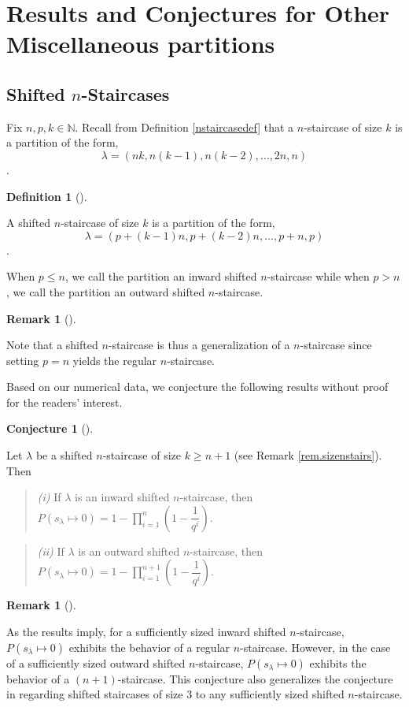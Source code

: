 \documentclass[numbers=enddot,12pt,final,onecolumn,notitlepage]{scrartcl}%
\theoremstyle{definition}
\newtheorem{defi}[theo]{Definition}
\newenvironment{definition}[1][]
{\begin{defi}[#1]\begin{leftbar}}
{\end{leftbar}\end{defi}}
\newtheorem{remk}[theo]{Remark}
\newenvironment{remark}[1][]
{\begin{remk}[#1]\begin{leftbar}}
{\end{leftbar}\end{remk}}
\newtheorem{conj}[theo]{Conjecture}
\newenvironment{conjecture}[1][]
{\begin{conj}[#1]\begin{leftbar}}
{\end{leftbar}\end{conj}}
\newenvironment{statement}{\begin{quote}}{\end{quote}}
\let\prodnonlimits\prod
\renewcommand{\prod}{\prodnonlimits\limits}
\newcommand{\NN}{\mathbb{N}}
\renewcommand{\leq}{\leqslant}
\renewcommand{\geq}{\geqslant}
\theoremstyle{plainsl}
\begin{document}
\section{Results and Conjectures for Other Miscellaneous partitions}
\subsection{Shifted $n$-Staircases}
Fix $n,p,k \in \NN$. Recall from Definition \ref{nstaircasedef} that a $n$-staircase of size $k$ is a partition of the form,
\[\lambda = (nk, n(k-1), n(k-2), \ldots,2n, n) \].

\begin{definition}
\label{shifted}
A shifted $n$-staircase of size $k$ is a partition of the form, 
\[\lambda = (p+(k-1)n, p+(k-2)n, \ldots,p+n, p) \].

When $p \leq n$, we call the partition an inward shifted $n$-staircase while when  $p > n$, we call the partition an outward shifted $n$-staircase.

\end{definition}

\begin{remark}
Note that a shifted $n$-staircase is thus a generalization of a $n$-staircase since setting $p=n$ yields the regular $n$-staircase.
\end{remark}

Based on our numerical data, we conjecture the following results without proof for the readers' interest. 

\begin{conjecture}
Let $\lambda$ be a shifted $n$-staircase of size $k\geq n+1$ (see Remark \ref{rem.sizenstairs}). Then 

\begin{statement}
\textit{(i)} If $\lambda$ is an inward shifted $n$-staircase, then $P(s_{\lambda} \longmapsto 0) = 1-\prod_{i=1}^{n} \left(  1-\dfrac{1}{q^{i}}\right)$.
\end{statement}
\begin{statement}
\textit{(ii)} If $\lambda$ is an outward shifted $n$-staircase, then $P(s_{\lambda} \longmapsto 0) = 1-\prod_{i=1}^{n+1} \left(  1-\dfrac{1}{q^{i}}\right)$.
\end{statement}

\end{conjecture}
\begin{remark}
As the results imply, for a sufficiently sized inward shifted $n$-staircase, $P(s_{\lambda} \longmapsto 0)$ exhibits the behavior of a regular $n$-staircase. However, in the case of a sufficiently sized outward shifted $n$-staircase, $P(s_{\lambda} \longmapsto 0)$ exhibits the behavior of a $(n+1)$-staircase. This conjecture also generalizes the conjecture in \cite{Anzis18} regarding shifted staircases of size $3$ to any sufficiently sized shifted $n$-staircase.
\end{remark}
\end{document}

